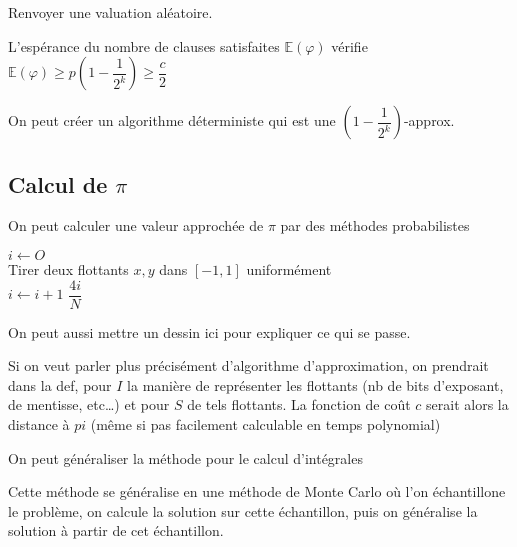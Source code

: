 \begin{algo}
	Renvoyer une valuation aléatoire.
\end{algo}

\begin{theorem}
	L'espérance du nombre de clauses satisfaites $\mathbb E(\varphi)$ vérifie $\mathbb E(\varphi) \geq p\left( 1 - \dfrac{1}{2^k}\right) \geq \dfrac{c}{2}$
\end{theorem}

\begin{rem}
	On peut créer un algorithme déterministe qui est une $\left( 1 - \dfrac{1}{2^k} \right)$-approx.
\end{rem}

\subsection{Calcul de $\pi$}

On peut calculer une valeur approchée de $\pi$ par des méthodes probabilistes

\begin{algorithm}
	\caption{$calcul\_pi(N)$}
	$i \gets O$\\
	{
		Tirer deux flottants $x, y$ dans $[-1, 1]$ uniformément\\
		{
			$i \gets i+1$ 
		}
	}
	\Retour $\dfrac{4i}{N}$
\end{algorithm}

\begin{com}
	On peut aussi mettre un dessin ici pour expliquer ce qui se passe.
\end{com}

\begin{com}
	Si on veut parler plus précisément d'algorithme d'approximation, on prendrait dans la def, pour $I$ la manière de représenter les flottants (nb de bits d'exposant, de mentisse, etc\dots) et pour $S$ de tels flottants. La fonction de coût $c$ serait alors la distance à $pi$ (même si pas facilement calculable en temps polynomial)
\end{com}

\begin{rem}
	On peut généraliser la méthode pour le calcul d'intégrales
\end{rem}

\begin{rem}
	Cette méthode se généralise en une méthode de Monte Carlo où l'on échantillone le problème, on calcule la solution sur cette échantillon, puis on généralise la solution à partir de cet échantillon.
\end{rem}